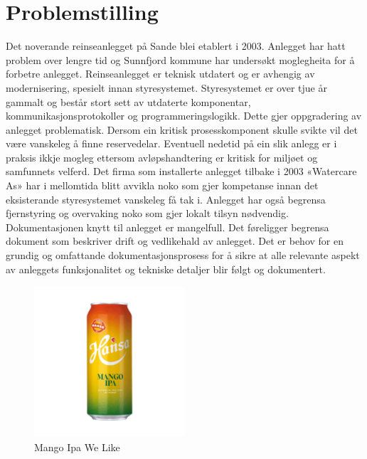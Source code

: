 \section{Problemstilling}
Det noverande reinseanlegget på Sande blei etablert i 2003. Anlegget har hatt problem over lengre tid og 
Sunnfjord kommune har undersøkt moglegheita for å forbetre anlegget. Reinseanlegget er teknisk utdatert og 
er avhengig av modernisering, spesielt innan styresystemet.
Styresystemet er over tjue år gammalt og består stort sett av utdaterte komponentar, 
kommunikasjonsprotokoller og programmeringslogikk. Dette gjer oppgradering av anlegget problematisk.
Dersom ein kritisk prosesskomponent skulle svikte vil det være vanskeleg å finne reservedelar. Eventuell 
nedetid på ein slik anlegg er i praksis ikkje mogleg ettersom avløpshandtering er kritisk for miljøet og 
samfunnets velferd.
Det firma som installerte anlegget tilbake i 2003 «Watercare As» har i mellomtida blitt avvikla noko som gjer 
kompetanse innan det eksisterande styresystemet vanskeleg få tak i.
Anlegget har også begrensa fjernstyring og overvaking noko som gjer lokalt tilsyn nødvendig.
Dokumentasjonen knytt til anlegget er mangelfull. Det føreligger begrensa dokument som beskriver drift og 
vedlikehald av anlegget. Det er behov for en grundig og omfattande dokumentasjonsprosess for å sikre at alle 
relevante aspekt av anleggets funksjonalitet og tekniske detaljer blir følgt og dokumentert.


\begin{figure}[htbp]
    \centering
    \includegraphics[width=0.5\textwidth]{Bilder/mango.jpg}
    \caption{Mango Ipa We Like}\label{fig:Mango-Logo}
\end{figure}
    